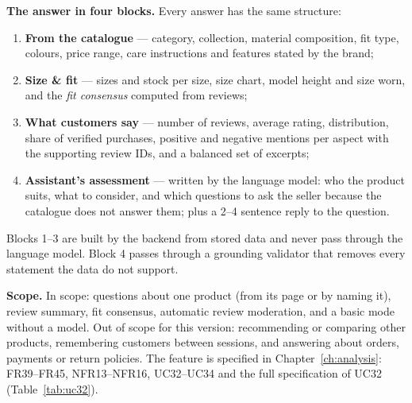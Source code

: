 \textbf{The answer in four blocks.} Every answer has the same structure:
\begin{enumerate}
  \item \textbf{From the catalogue} --- category, collection, material composition, fit type, colours, price range, care instructions and features stated by the brand;
  \item \textbf{Size \& fit} --- sizes and stock per size, size chart, model height and size worn, and the \emph{fit consensus} computed from reviews;
  \item \textbf{What customers say} --- number of reviews, average rating, distribution, share of verified purchases, positive and negative mentions per aspect with the supporting review IDs, and a balanced set of excerpts;
  \item \textbf{Assistant's assessment} --- written by the language model: who the product suits, what to consider, and which questions to ask the seller because the catalogue does not answer them; plus a 2--4 sentence reply to the question.
\end{enumerate}
Blocks 1--3 are built by the backend from stored data and never pass through the language model. Block 4 passes through a grounding validator that removes every statement the data do not support.

\textbf{Scope.} In scope: questions about one product (from its page or by naming it), review summary, fit consensus, automatic review moderation, and a basic mode without a model. Out of scope for this version: recommending or comparing other products, remembering customers between sessions, and answering about orders, payments or return policies. The feature is specified in Chapter~\ref{ch:analysis}: FR39--FR45, NFR13--NFR16, UC32--UC34 and the full specification of UC32 (Table~\ref{tab:uc32}).


